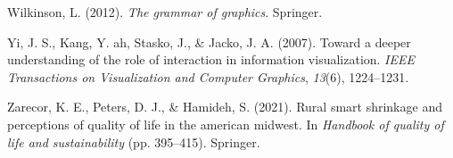 \documentclass[print]{nuthesis}
\newlength{\cslhangindent}
\newenvironment{CSLReferences}[2]%
{\setlength{\parindent}{0pt}%
\everypar{\setlength{\hangindent}{\cslhangindent}}\ignorespaces}%
{\par}
\begin{document}
\begin{CSLReferences}{1}{0}
\leavevmode{}%
Wilkinson, L. (2012). \emph{The grammar of graphics}. Springer.

\leavevmode{}%
Yi, J. S., Kang, Y. ah, Stasko, J., \& Jacko, J. A. (2007). Toward a deeper understanding of the role of interaction in information visualization. \emph{IEEE Transactions on Visualization and Computer Graphics}, \emph{13}(6), 1224--1231.

\leavevmode{}%
Zarecor, K. E., Peters, D. J., \& Hamideh, S. (2021). Rural smart shrinkage and perceptions of quality of life in the american midwest. In \emph{Handbook of quality of life and sustainability} (pp. 395--415). Springer.

\end{CSLReferences}


\backmatter

% 






\end{document}
